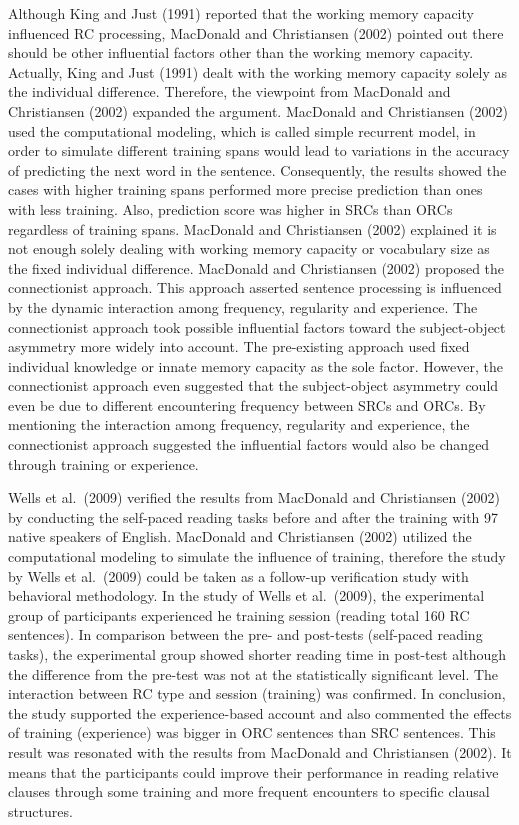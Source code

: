 \documentclass[
]{article}
\begin{document}
Although King and Just (1991) reported that the working memory capacity
influenced RC processing, MacDonald and Christiansen (2002) pointed out
there should be other influential factors other than the working memory
capacity. Actually, King and Just (1991) dealt with the working memory
capacity solely as the individual difference. Therefore, the viewpoint
from MacDonald and Christiansen (2002) expanded the argument. MacDonald
and Christiansen (2002) used the computational modeling, which is called
simple recurrent model, in order to simulate different training spans
would lead to variations in the accuracy of predicting the next word in
the sentence. Consequently, the results showed the cases with higher
training spans performed more precise prediction than ones with less
training. Also, prediction score was higher in SRCs than ORCs regardless
of training spans. MacDonald and Christiansen (2002) explained it is not
enough solely dealing with working memory capacity or vocabulary size as
the fixed individual difference. MacDonald and Christiansen (2002)
proposed the connectionist approach. This approach asserted sentence
processing is influenced by the dynamic interaction among frequency,
regularity and experience. The connectionist approach took possible
influential factors toward the subject-object asymmetry more widely into
account. The pre-existing approach used fixed individual knowledge or
innate memory capacity as the sole factor. However, the connectionist
approach even suggested that the subject-object asymmetry could even be
due to different encountering frequency between SRCs and ORCs. By
mentioning the interaction among frequency, regularity and experience,
the connectionist approach suggested the influential factors would also
be changed through training or experience.

Wells et al.~(2009) verified the results from MacDonald and Christiansen
(2002) by conducting the self-paced reading tasks before and after the
training with 97 native speakers of English. MacDonald and Christiansen
(2002) utilized the computational modeling to simulate the influence of
training, therefore the study by Wells et al.~(2009) could be taken as a
follow-up verification study with behavioral methodology. In the study
of Wells et al.~(2009), the experimental group of participants
experienced he training session (reading total 160 RC sentences). In
comparison between the pre- and post-tests (self-paced reading tasks),
the experimental group showed shorter reading time in post-test although
the difference from the pre-test was not at the statistically
significant level. The interaction between RC type and session
(training) was confirmed. In conclusion, the study supported the
experience-based account and also commented the effects of training
(experience) was bigger in ORC sentences than SRC sentences. This result
was resonated with the results from MacDonald and Christiansen (2002).
It means that the participants could improve their performance in
reading relative clauses through some training and more frequent
encounters to specific clausal structures.
\end{document}

